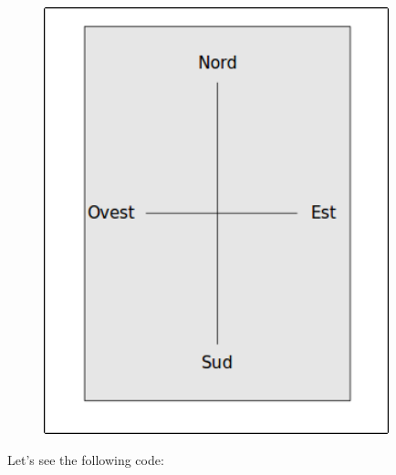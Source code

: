 \begin{figure}[H]
   \centering
   \includegraphics[width=10.0cm,trim=8 8 8 8,clip]{./images/disegnare/disegnare-37.png}
   \label{dis-37}
\end{figure}

\vskip 1cm

Let's see the following code:

\pagebreak

\vskip 1cm

